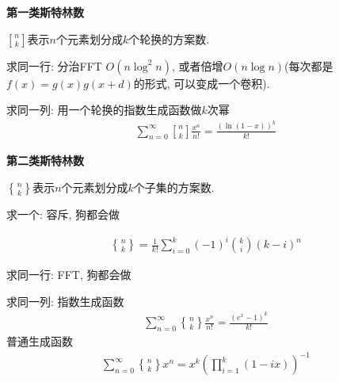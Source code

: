 \textbf{第一类斯特林数}

$n\brack k$表示$n$个元素划分成$k$个轮换的方案数.

求同一行: 分治FFT $O(n\log ^2 n)$, 或者倍增$O(n\log n)$(每次都是$f(x) = g(x) g(x + d)$的形式, 可以变成一个卷积).

求同一列: 用一个轮换的指数生成函数做$k$次幂
$$\begin{aligned} \sum_{n = 0} ^ \infty {n \brack k} \frac {x ^ n} {n!} = \frac {\left(\ln (1 - x)\right) ^ k} {k!} \end{aligned}$$

\textbf{第二类斯特林数}

$n\brace k$表示$n$个元素划分成$k$个子集的方案数.

求一个: 容斥, 狗都会做

$$\begin{aligned} {n \brace k} = \frac 1 {k!} \sum_{i = 0} ^ k (-1) ^ i {k \choose i} (k - i) ^ n \end{aligned}$$

求同一行: FFT, 狗都会做

求同一列: 指数生成函数
$$\begin{aligned} \sum_{n = 0} ^ \infty {n \brace k} \frac {x ^ n} {n!} = \frac {\left(e ^ x - 1\right) ^ k} {k!} \end{aligned}$$
普通生成函数
$$\begin{aligned} \sum_{n = 0} ^ \infty {n \brace k} x ^ n = x ^ k \left(\prod_{i = 1} ^ k (1 - i x)\right) ^ {-1} \end{aligned}$$